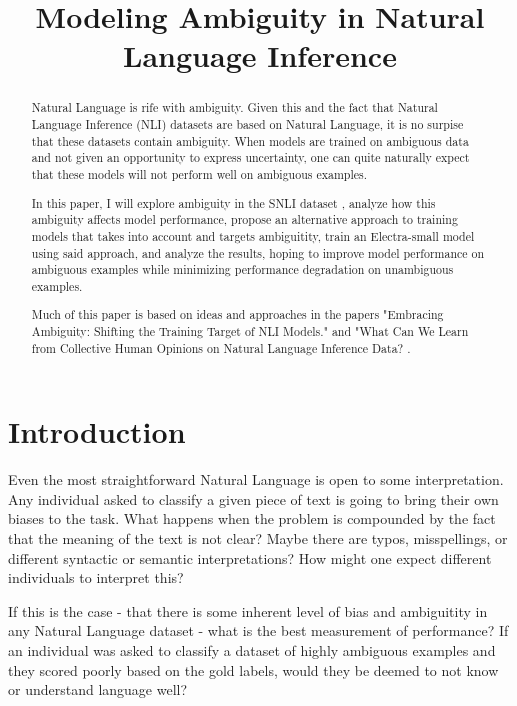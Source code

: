 \documentclass[11pt]{article}
\title{Modeling Ambiguity in Natural Language Inference}
\begin{document}
\maketitle
\begin{abstract}
Natural Language is rife with ambiguity. Given this and the fact that Natural Language Inference (NLI) datasets
are based on Natural Language, it is no surpise that these datasets contain ambiguity. When models are trained
on ambiguous data and not given an opportunity to express uncertainty, one can quite naturally expect that these
models will not perform well on ambiguous examples.

In this paper, I will explore ambiguity in the SNLI dataset \citep{snli:emnlp2015}, analyze how this ambiguity affects model
performance, propose an alternative approach to training models that takes into account and targets ambiguitity,
train an Electra-small model using said approach, and analyze the results, hoping to improve model performance on
ambiguous examples while minimizing performance degradation on unambiguous examples.

Much of this paper is based on ideas and approaches in the papers "Embracing Ambiguity: Shifting the Training Target
of NLI Models." \citep{DBLP:journals/corr/abs-2106-03020} and "What Can We Learn from Collective Human Opinions on
Natural Language Inference Data? \citep{ynie2020chaosnli}.
\end{abstract}

\section{Introduction}

Even the most straightforward Natural Language is open to some interpretation. Any individual asked to classify
a given piece of text is going to bring their own biases to the task. What happens when the problem is
compounded by the fact that the meaning of the text is not clear? Maybe there are typos, misspellings, or
different syntactic or semantic interpretations? How might one expect different individuals to interpret this?

If this is the case - that there is some inherent level of bias and ambiguitity in any Natural Language dataset
- what is the best measurement of performance? If an individual was asked to classify a dataset of highly
ambiguous examples and they scored poorly based on the gold labels, would they be deemed to not know or
understand language well?
\end{document}
